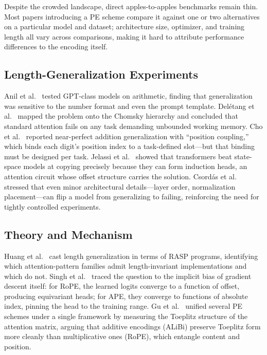 \documentclass[10pt,twocolumn]{article}
\begin{document}
Despite the crowded landscape, direct apples-to-apples benchmarks remain thin.
Most papers introducing a PE scheme compare it against one or two alternatives on a particular model and dataset; architecture size, optimizer, and training length all vary across comparisons, making it hard to attribute performance differences to the encoding itself.

\subsection{Length-Generalization Experiments}

Anil et al.~\cite{anil2022exploring} tested GPT-class models on arithmetic, finding that generalization was sensitive to the number format and even the prompt template.
Del\'{e}tang et al.~\cite{deletang2023neural} mapped the problem onto the Chomsky hierarchy and concluded that standard attention fails on any task demanding unbounded working memory.
Cho et al.~\cite{cho2024position} reported near-perfect addition generalization with ``position coupling,'' which binds each digit's position index to a task-defined slot---but that binding must be designed per task.
Jelassi et al.~\cite{jelassi2024repeat} showed that transformers beat state-space models at copying precisely because they can form induction heads, an attention circuit whose offset structure carries the solution.
Csord\'{a}s et al.~\cite{csordas2022devil} stressed that even minor architectural details---layer order, normalization placement---can flip a model from generalizing to failing, reinforcing the need for tightly controlled experiments.

\subsection{Theory and Mechanism}

Huang et al.~\cite{huang2025formal} cast length generalization in terms of RASP programs, identifying which attention-pattern families admit length-invariant implementations and which do not.
Singh et al.~\cite{singh2026relative} traced the question to the implicit bias of gradient descent itself: for RoPE, the learned logits converge to a function of offset, producing equivariant heads; for APE, they converge to functions of absolute index, pinning the head to the training range.
Gu et al.~\cite{gu2026deconstructing} unified several PE schemes under a single framework by measuring the Toeplitz structure of the attention matrix, arguing that additive encodings (ALiBi) preserve Toeplitz form more cleanly than multiplicative ones (RoPE), which entangle content and position.
\end{document}
